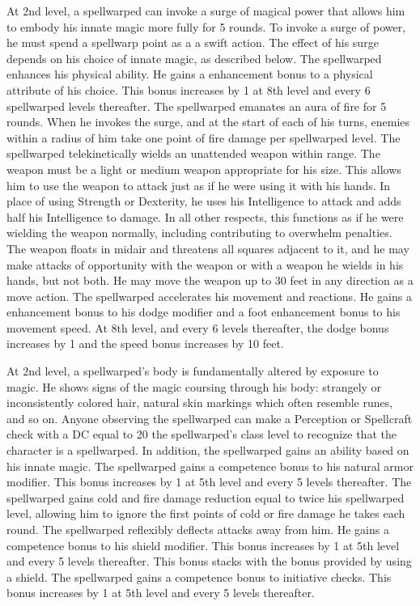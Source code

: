  At 2nd level, a spellwarped can invoke a surge of magical power that allows him to embody his innate magic more fully for 5 rounds. To invoke a surge of power, he must spend a spellwarp point as a a swift action. The effect of his surge depends on his choice of innate magic, as described below.
 The spellwarped enhances his physical ability. He gains a  enhancement bonus to a physical attribute of his choice. This bonus increases by 1 at 8th level and every 6 spellwarped levels thereafter.
 The spellwarped emanates an aura of fire for 5 rounds. When he invokes the surge, and at the start of each of his turns, enemies within a \areasmall radius of him take one point of fire damage per spellwarped level.
 The spellwarped telekinetically wields an unattended weapon within \rngclose range. The weapon must be a light or medium weapon appropriate for his size. This allows him to use the weapon to attack just as if he were using it with his hands. In place of using Strength or Dexterity, he uses his Intelligence to attack and adds half his Intelligence to damage. In all other respects, this functions as if he were wielding the weapon normally, including contributing to overwhelm penalties. The weapon floats in midair and threatens all squares adjacent to it, and he may make attacks of opportunity with the weapon or with a weapon he wields in his hands, but not both. He may move the weapon up to 30 feet in any direction as a move action.
 The spellwarped accelerates his movement and reactions. He gains a  enhancement bonus to his dodge modifier and a  foot enhancement bonus to his movement speed. At 8th level, and every 6 levels thereafter, the dodge bonus increases by 1 and the speed bonus increases by 10 feet.

 At 2nd level, a spellwarped's body is fundamentally altered by exposure to magic. He shows signs of the magic coursing through his body: strangely or inconsistently colored hair, natural skin markings which often resemble runes, and so on. Anyone observing the spellwarped can make a Perception or Spellcraft check with a DC equal to 20 \sub the spellwarped's class level to recognize that the character is a spellwarped. In addition, the spellwarped gains an ability based on his innate magic.
 The spellwarped gains a  competence bonus to his natural armor modifier. This bonus increases by 1 at 5th level and every 5 levels thereafter.
 The spellwarped gains cold and fire damage reduction equal to twice his spellwarped level, allowing him to ignore the first points of cold or fire damage he takes each round.
 The spellwarped reflexibly deflects attacks away from him. He gains a  competence bonus to his shield modifier. This bonus increases by 1 at 5th level and every 5 levels thereafter. This bonus stacks with the bonus provided by using a shield.
 The spellwarped gains a  competence bonus to initiative checks. This bonus increases by 1 at 5th level and every 5 levels thereafter.


